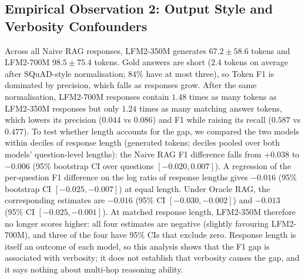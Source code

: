 \documentclass[10pt]{article}
\begin{document}
\subsection{Empirical Observation 2: Output Style and Verbosity Confounders}
Across all Naive RAG responses, LFM2-350M generates $67.2 \pm 58.6$ tokens and LFM2-700M $98.5 \pm 75.4$ tokens. Gold answers are short ($2.4$ tokens on average after SQuAD-style normalisation; $84\%$ have at most three), so Token F1 \citep{rajpurkar2016squad} is dominated by precision, which falls as responses grow. After the same normalisation, LFM2-700M responses contain $1.48$ times as many tokens as LFM2-350M responses but only $1.24$ times as many matching answer tokens, which lowers its precision ($0.044$ vs $0.086$) and F1 while raising its recall ($0.587$ vs $0.477$). To test whether length accounts for the gap, we compared the two models within deciles of response length (generated tokens; deciles pooled over both models' question-level lengths): the Naive RAG F1 difference falls from $+0.038$ to $-0.006$ (95\% bootstrap CI over questions $[-0.020, 0.007]$). A regression of the per-question F1 difference on the log ratio of response lengths gives $-0.016$ (95\% bootstrap CI $[-0.025, -0.007]$) at equal length. Under Oracle RAG, the corresponding estimates are $-0.016$ (95\% CI $[-0.030, -0.002]$) and $-0.013$ (95\% CI $[-0.025, -0.001]$). At matched response length, LFM2-350M therefore no longer scores higher: all four estimates are negative (slightly favouring LFM2-700M), and three of the four have 95\% CIs that exclude zero. Response length is itself an outcome of each model, so this analysis shows that the F1 gap is associated with verbosity; it does not establish that verbosity causes the gap, and it says nothing about multi-hop reasoning ability.
\end{document}
